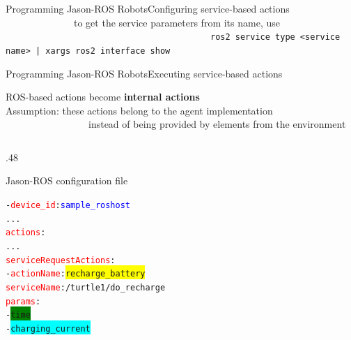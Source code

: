 \documentclass[compress]{beamer}
\newcommand{\yamlkey}[1]{\textcolor{red}{\texttt{#1}}}
\newcommand{\yamlvalue}[1]{\textcolor{blue}{\texttt{#1}}}
\begin{document}
\begin{frame}[fragile]{Programming Jason-ROS Robots}{Configuring service-based actions}{}
  \vspace{-.5cm}
 \ \ \ \ \ \ \ \ \ \ \ \ \ \  {\tiny to get the service parameters from its name, use}\\
 
 \vspace{-.5cm}
 \ \ \ \ \ \ \ \ \ \ \ \ \ \ \ \ \ \ \ \ \ \ \ \ \ \ \ \ \ \ \ \ \ \ \ \ \ \ \ \ \ \  {\tiny\texttt{ros2 service type <service name> | xargs ros2 interface show}}
 

\scriptsize

\end{frame}


\begin{frame}[fragile]{Programming Jason-ROS Robots}{Executing service-based actions}{}

\footnotesize

ROS-based actions become {\bf internal actions}\\


\scriptsize 
Assumption: these actions belong to the agent implementation\\


\vspace{-.4cm}
\ \ \ \ \ \ \ \ \ \ \ \ \ \ \ \ \ {\ssmall instead of being provided by elements from the environment}



\begin{columns}

\begin{column}{.48\textwidth}

\begin{block}{{\ssmall Jason-ROS configuration file}}


\scriptsize
\begin{alltt}\ssmall
- \yamlkey{device_id}: \yamlvalue{sample_roshost}
     ...
  \yamlkey{actions}:        
        ...
     \yamlkey{serviceRequestActions}:
        - \yamlkey{actionName}: \colorbox{yellow}{recharge_battery}
          \yamlkey{serviceName}: /turtle1/do_recharge
          \yamlkey{params}:
             - \colorbox{green}{time}
             - \colorbox{cyan}{charging_current}
\end{alltt}
    
\end{block}  
\end{column}

\hspace{-20pt} %


\end{columns}
\end{frame}
\end{document}
